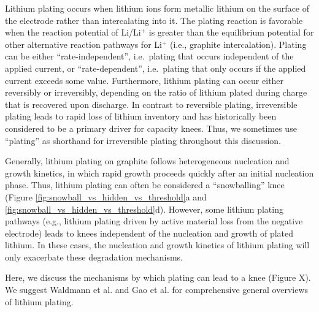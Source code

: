 \documentclass[journal=jpclcd,manuscript=article]{achemso}
\begin{document}
Lithium plating occurs when lithium ions form metallic lithium on the surface of the electrode rather than intercalating into it. The plating reaction is favorable when the reaction potential of Li/Li$^+$ is greater than the equilibrium potential for other alternative reaction pathways for Li$^+$ (i.e., graphite intercalation).\cite{gao_interplay_2021} Plating can be either ``rate-independent'', i.e.\ plating that occurs independent of the applied current, or ``rate-dependent'', i.e.\ plating that only occurs if the applied current exceeds some value.  Furthermore, lithium plating can occur either reversibly or irreversibly, depending on the ratio of lithium plated during charge that is recovered upon discharge. In contrast to reversible plating, irreversible plating leads to rapid loss of lithium inventory and has historically been considered to be a primary driver for capacity knees. Thus, we sometimes use ``plating'' as shorthand for irreversible plating throughout this discussion.

Generally, lithium plating on graphite follows heterogeneous nucleation and growth kinetics, in which rapid growth proceeds quickly after an initial nucleation phase.\cite{ely_heterogeneous_2013, pei_nanoscale_2017, gao_interplay_2021}
Thus, lithium plating can often be considered a ``snowballing'' knee (Figure \ref{fig:snowball_vs_hidden_vs_threshold}a and \ref{fig:snowball_vs_hidden_vs_threshold}d). However, some lithium plating pathways (e.g., lithium plating driven by active material loss from the negative electrode) leads to knees independent of the nucleation and growth of plated lithium.
In these cases, the nucleation and growth kinetics of lithium plating will only exacerbate these degradation mechanisms.

Here, we discuss the mechanisms by which plating can lead to a knee (Figure X). We suggest Waldmann et al.\cite{waldmann_li_2018} and Gao et al.\cite{gao_interplay_2021} for comprehensive general overviews of lithium plating.

\end{document}
